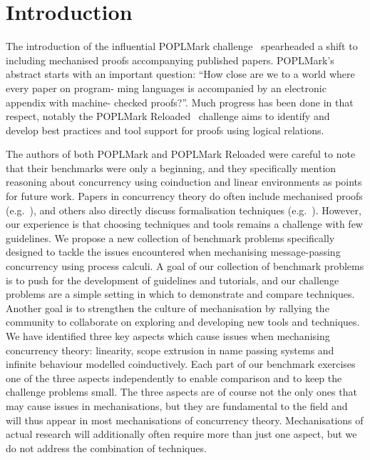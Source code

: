 \documentclass[runningheads]{llncs}
\begin{document}
\section{Introduction}


The introduction of the influential POPLMark challenge~\cite{POPLMark}
spearheaded a shift to including mechanised proofs accompanying
published papers. POPLMark's abstract starts with an important
question: ``How close are we to a world where every paper on program-
ming languages is accompanied by an electronic appendix with machine-
checked proofs?''. Much progress has been done in that respect,
notably the POPLMark Reloaded~\cite{POPLMarkReloaded} challenge aims
to identify and develop best practices and tool support for proofs
using logical relations.

The authors of both POPLMark and POPLMark Reloaded
were careful to note that their benchmarks were only a beginning, and
they specifically mention reasoning about concurrency using
coinduction and linear environments as points for future work. Papers
in concurrency theory do often include mechanised proofs
(e.g.~\cite{DBLP:conf/pldi/Castro-Perez0GY21,DBLP:conf/tacas/CastroFY20,lmcs:9985,
  DBLP:journals/jar/CruzFilipeMP23, Tirore:2023}), and others also
directly discuss formalisation techniques
(e.g.~\cite{DBLP:journals/jar/BengtsonPW16, DBLP:conf/tphol/Gay01,
  DBLP:conf/ppdp/Thiemann19, DBLP:conf/forte/ZalakainD21}). However,
our experience is that choosing techniques and tools remains a
challenge with few guidelines. We propose a new collection of
benchmark problems specifically designed to tackle the issues
encountered when mechanising message-passing concurrency using process
calculi. A goal of our collection of benchmark problems is to push for
the development of guidelines and tutorials, and our challenge
problems are a simple setting in which to demonstrate and compare
techniques. Another goal is to strengthen the culture of mechanisation
by rallying the community to collaborate on exploring and developing
new tools and techniques. We have identified three key aspects which
cause issues when mechanising concurrency theory: linearity, scope
extrusion in name passing systems and infinite behaviour modelled
coinductively. Each part of our benchmark exercises one of the three aspects
independently to enable comparison and to keep the challenge problems
small. The three aspects are of course not the only ones that may
cause issues in mechanisations, but they are fundamental to the field
and will thus appear in most mechanisations of concurrency theory.
Mechanisations of actual research will additionally often require more than just
one aspect, but we do not address the combination of techniques.
\end{document}
